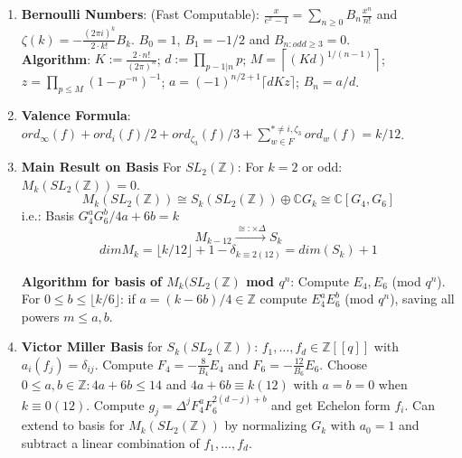 \documentclass{article}
\newcommand{\C}{\mathbb{C}}
\newcommand{\Z}{\mathbb{Z}}
\newcommand{\raa}[1]{\overset{#1}{\longrightarrow}}
\begin{document}
\begin{multicols}{2}
\begin{enumerate}
\item \textbf{Bernoulli Numbers}: (Fast Computable): $\frac{x}{e^x - 1} = \sum_{n \geq 0} B_n \frac{x^n}{n!}$ and $\zeta(k) = -\frac{(2\pi i)^k}{2\cdot k!}B_k$. $B_0 = 1$, $B_1 = -1/2$ and $B_{n:odd \geq 3} = 0$.\\
\textbf{Algorithm}: $K := \frac{2\cdot n!}{(2\pi)^n}$; $d:= \prod_{p-1|n}p$; $M = \left\lceil (Kd)^{1/(n-1)} \right\rceil$; $z = \prod_{p \leq M}(1-p^{-n})^{-1}$; $a = (-1)^{n/2+1}\lceil dKz\rceil$; $B_n = a/d$. 

\item \textbf{Valence Formula}: $ord_\infty(f) + ord_i(f)/2 + ord_{\zeta_3}(f)/3 + \sum^{*\neq i,\zeta_3}_{w \in F} ord_w(f) = k/12$.


\item \textbf{Main Result on Basis} For $SL_2(\Z)$: For $k = 2$ or odd: $M_k(SL_2(\Z)) = 0$. 
\[M_k (SL_2(\Z)) \cong S_k(SL_2(\Z)) \oplus \C G_k \cong \C[G_4,G_6]\]
i.e.: Basis $G_4^aG_6^b/4a+6b = k$
\[M_{k-12} \raa{\cong: \times \Delta} S_k\] 
\[dim M_k = \lfloor k/12 \rfloor + 1 - \delta_{k \equiv 2(12)} = dim(S_k) + 1\]

\textbf{Algorithm for basis of $M_k(SL_2(\Z)$ mod $q^n$}:
Compute $E_4,E_6$ (mod $q^n$). For $0 \leq b \leq \lfloor k/6 \rfloor$: if $a = (k-6b)/4 \in \Z$ compute $E_4^aE_6^b$ (mod $q^n$), saving all powers $m \leq a,b$.

\item \textbf{Victor Miller Basis} for $S_k(SL_2(\Z))$: $f_1,\ldots,f_d \in \Z[[q]]$ with $a_i(f_j) = \delta_{ij}$. Compute $F_4 = -\frac{8}{B_4}E_4$ and $F_6 = -\frac{12}{B_6}E_6$. Choose $0 \leq a,b \in \Z: 4a + 6b \leq 14$ and $4a + 6b \equiv k (12)$ with $a = b = 0$ when $k \equiv 0 (12)$. Compute $g_j = \Delta^j F_4^a F_6^{2(d-j)+b}$ and get Echelon form $f_i$. Can extend to basis for $M_k(SL_2(\Z))$ by normalizing $G_k$ with $a_0 = 1$ and subtract a linear combination of $f_1,\ldots,f_d$.



\end{enumerate}
\end{multicols}
\end{document}
